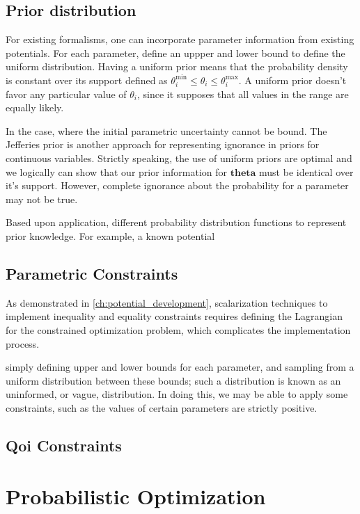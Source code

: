 \subsection{Prior distribution}

For existing formalisms, one can incorporate parameter information from existing potentials.  For each parameter, define an uppper and lower bound to define the uniform distribution.  Having a uniform prior means that the probability density is constant over its support defined as $\theta_{i}^{\text{min}} \leq \theta_i \leq \theta_{i}^{\text{max}}.$  A uniform prior doesn't favor any particular value of $\theta_i$, since it supposes that all values in the range are equally likely.

In the case, where the initial parametric uncertainty cannot be bound.  The Jefferies prior is another approach for representing ignorance in priors for continuous variables.
Strictly speaking, the use of uniform priors are optimal and we logically can show that our prior information for $\bm{theta}$ must be identical over it's support.  However, complete ignorance about the probability for a parameter may not be true.

Based upon application, different probability distribution functions to represent prior knowledge.  For example, a known potential

\subsection{Parametric Constraints}

As demonstrated in \ref{ch:potential_development}, scalarization techniques to implement inequality and equality constraints requires defining the Lagrangian for the constrained optimization problem, which complicates the implementation process.

simply defining upper and lower bounds for each parameter, and sampling from a uniform distribution between these bounds; such a distribution is known as an uninformed, or vague, distribution.  In doing this, we may be able to apply some constraints, such as the values of certain parameters are strictly positive.

\subsection{Qoi Constraints}

\section{Probabilistic Optimization}

